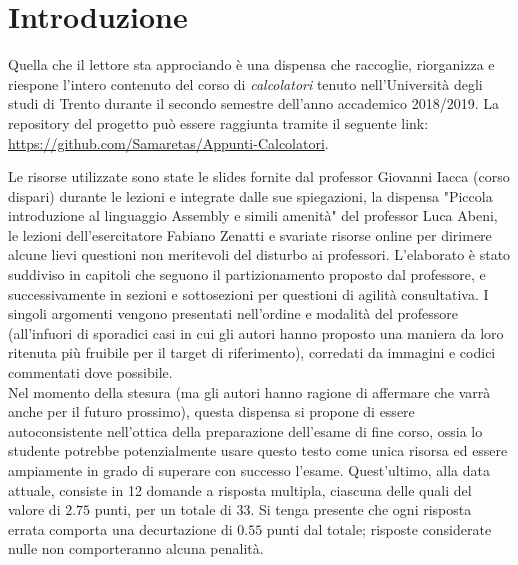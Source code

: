 \documentclass[class=book, crop=false, oneside]{standalone}
\begin{document}
\chapter*{Introduzione}
 

Quella che il lettore sta approciando è una dispensa che raccoglie, riorganizza e riespone l'intero contenuto del corso di \emph{calcolatori} tenuto nell'Università degli studi di Trento durante il secondo semestre dell'anno accademico 2018/2019. La repository del progetto può essere raggiunta tramite il seguente link: \url{https://github.com/Samaretas/Appunti-Calcolatori}.

Le risorse utilizzate sono state le slides fornite dal professor Giovanni Iacca (corso dispari) durante le lezioni e integrate dalle sue spiegazioni, la dispensa "Piccola introduzione al linguaggio Assembly e simili amenità" del professor Luca Abeni, le lezioni dell'esercitatore Fabiano Zenatti e svariate risorse online per dirimere alcune lievi questioni non meritevoli del disturbo ai professori. L'elaborato è stato suddiviso in capitoli che seguono il partizionamento proposto dal professore, e successivamente in sezioni e sottosezioni per questioni di agilità consultativa. I singoli argomenti vengono presentati nell'ordine e modalità del professore (all'infuori di sporadici casi in cui gli autori hanno proposto una maniera da loro ritenuta più fruibile per il target di riferimento), corredati da immagini e codici commentati dove possibile.\\

Nel momento della stesura (ma gli autori hanno ragione di affermare che varrà anche per il futuro prossimo), questa dispensa si propone di essere autoconsistente nell'ottica della preparazione dell'esame di fine corso, ossia lo studente potrebbe potenzialmente usare questo testo come unica risorsa ed essere ampiamente in grado di superare con successo l'esame. Quest'ultimo, alla data attuale, consiste in 12 domande a risposta multipla, ciascuna delle quali del valore di \(2.75\) punti, per un totale di \(33\). Si tenga presente che ogni risposta errata comporta una decurtazione di \(0.55\) punti dal totale; risposte considerate nulle non comporteranno alcuna penalità.\\
\end{document}
